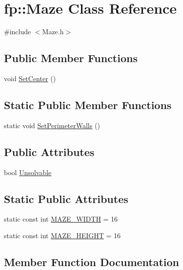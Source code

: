 \hypertarget{classfp_1_1_maze}{}\section{fp\+:\+:Maze Class Reference}
\label{classfp_1_1_maze}


{\ttfamily \#include $<$Maze.\+h$>$}

\subsection*{Public Member Functions}
\begin{DoxyCompactItemize}
\item 
void \hyperlink{classfp_1_1_maze_af1ffa713840a40bdcedb99e79ea5bde3}{Set\+Center} ()
\end{DoxyCompactItemize}
\subsection*{Static Public Member Functions}
\begin{DoxyCompactItemize}
\item 
static void \hyperlink{classfp_1_1_maze_a689d998d05f671c2644804ee912c5e79}{Set\+Perimeter\+Walls} ()
\end{DoxyCompactItemize}
\subsection*{Public Attributes}
\begin{DoxyCompactItemize}
\item 
bool \hyperlink{classfp_1_1_maze_abdf504125bc0cd3ea18ba17b0887a5a2}{Unsolvable}
\end{DoxyCompactItemize}
\subsection*{Static Public Attributes}
\begin{DoxyCompactItemize}
\item 
static const int \hyperlink{classfp_1_1_maze_ae976c87b67bf82c41ede75a19ac28c2c}{M\+A\+Z\+E\+\_\+\+W\+I\+D\+TH} = 16
\item 
static const int \hyperlink{classfp_1_1_maze_a3cee2050b4d60bceacc9307e7016b931}{M\+A\+Z\+E\+\_\+\+H\+E\+I\+G\+HT} = 16
\end{DoxyCompactItemize}


\subsection{Member Function Documentation}
\mbox{\label{classfp_1_1_maze_af1ffa713840a40bdcedb99e79ea5bde3}} 
